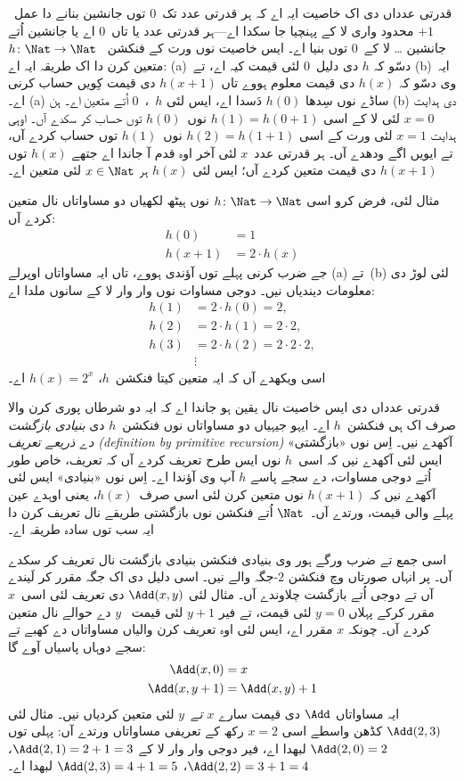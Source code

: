 \documentclass[../../../include/open-logic-section]{subfiles}
\begin{document}

قدرتی عدداں دی اک خاصیت ایہ اے کہ ہر قدرتی عدد تک~$0$
توں جانشین بنانے دا عمل~$+1$ محدود واری لا کے پہنچیا جا
سکدا اے---ہر قدرتی عدد یا تاں~$0$ اے یا جانشین اُتے
جانشین \dots{} لا کے~$0$ توں بنیا اے۔ ایس خاصیت
نوں ورت کے فنکشن
~$h\colon\Nat \to \Nat$ متعین کرن دا اک طریقہ ایہ اے:
(a)~دسّو کہ $h$ دی دلیل~$0$ لئی قیمت کیہ اے، تے
(b)~ایہ وی دسّو کہ $h(x)$ دی قیمت معلوم ہووے تاں
$h(x+1)$ دی قیمت کِویں حساب کرنی اے۔ (a) ساڈے نوں
سِدھا $h(0)$ دَسدا اے، ایس لئی $h$~،~$0$ اُتے
متعین اے۔ ہن (b) دی ہدایت $x=0$ لئی لا کے اسی
$h(1) = h(0+1)$ نوں~$h(0)$ توں حساب کر سکدے آں۔
اوہی ہدایت $x=1$ لئی ورت کے اسی $h(2) = h(1+1)$
نوں~$h(1)$ توں حساب کردے آں، تے ایویں اگے ودھدے آں۔
ہر قدرتی عدد~$x$ لئی آخر اوہ قدم آ جاندا اے جتھے
$h(x)$ توں $h(x+1)$ دی قیمت متعین کردے آں؛ ایس
لئی $h(x)$ ہر $x \in \Nat$ لئی متعین اے۔

مثال لئی، فرض کرو اسی $h\colon \Nat \to \Nat$ نوں
ہیٹھ لکھیاں دو مساواتاں نال متعین کردے آں:
\begin{align*}
h(0) & =  1\\
h(x+1) & =  2 \cdot h(x)
\end{align*}
جے ضرب کرنی پہلے توں آؤندی ہووے، تاں ایہ مساواتاں
اوپرلے (a) تے~(b) لئی لوڑ دی معلومات دیندیاں نیں۔
دوجی مساوات نوں وار وار لا کے سانوں ملدا اے:
\begin{align*}
  h(1) & = 2\cdot h(0) = 2,\\
  h(2) & = 2\cdot h(1) = 2\cdot 2,\\
  h(3) & = 2 \cdot h(2) = 2\cdot 2 \cdot 2,\\
  & \vdots
\end{align*}
اسی ویکھدے آں کہ ایہ متعین کیتا فنکشن~$h$،
$h(x) = 2^x$ اے۔

قدرتی عدداں دی ایس خاصیت نال یقین ہو جاندا اے کہ
ایہ دو شرطاں پوری کرن والا صرف اک ہی فنکشن~$h$ اے۔
ایہو جیہیاں دو مساواتاں نوں فنکشن~$h$ دی
\emph{بنیادی بازگشت دے ذریعے تعریف (definition by primitive
  recursion)} آکھدے نیں۔ اِس نوں «بازگشتی» ایس لئی
آکھدے نیں کہ اسی~$h$ نوں ایس طرح تعریف کردے آں
کہ تعریف، خاص طور اُتے دوجی مساوات، دے سجے پاسے
$h$ آپ وی آؤندا اے۔ اِس نوں «بنیادی» ایس لئی
آکھدے نیں کہ $h(x+1)$ نوں متعین کرن لئی اسی
صرف~$h(x)$، یعنی اوہدے عین پہلے والی قیمت، ورتدے
آں۔~$\Nat$ اُتے فنکشن نوں بازگشتی طریقے نال تعریف
کرن دا ایہ سب توں سادہ طریقہ اے۔

اسی جمع تے ضرب ورگے ہور وی بنیادی فنکشن بنیادی
بازگشت نال تعریف کر سکدے آں۔ پر انہاں صورتاں وچ
فنکشن $2$-جگہ والے نیں۔ اسی دلیل دی اک جگہ مقرر
کر لَیندے آں تے دوجی اُتے بازگشت چلاوندے آں۔ مثال
لئی $\Add(x, y)$ دی تعریف لئی اسی~$x$ مقرر کرکے
پہلاں $y=0$ لئی قیمت، تے فیر $y+1$ لئی قیمت
~$y$ دے حوالے نال متعین کردے آں۔ چونکہ $x$ مقرر
اے، ایس لئی اوہ تعریف کرن والیاں مساواتاں دے کھبے
تے سجے دوہاں پاسیاں آوے گا:
\begin{align*}
\Add(x,0) & =  x\\
\Add(x,y+1) & =  \Add(x,y)+1
\end{align*}
ایہ مساواتاں $\Add$ دی قیمت سارے $x$
\emph{تے}~$y$ لئی متعین کردیاں نیں۔ مثال لئی
$\Add(2,3)$ کڈھن واسطے اسی $x = 2$ رکھ کے
تعریفی مساواتاں ورتدے آں: پہلی توں
$\Add(2,0) = 2$ لبھدا اے، فیر دوجی وار وار
لا کے $\Add(2,1) = 2 + 1 = 3$،
$\Add(2, 2) = 3 + 1 = 4$،
$\Add(2, 3) = 4 + 1 = 5$ لبھدا اے۔
\end{document}
